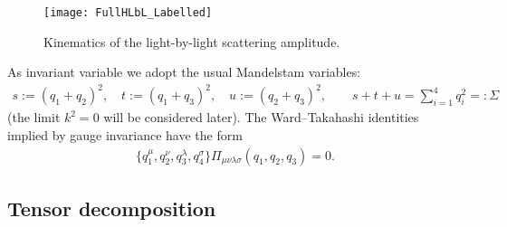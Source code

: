 \documentclass[epj]{webofc}
\newcommand{\<}{\langle}
\renewcommand{\>}{\rangle}
\begin{document}
\begin{figure}[t]
	\centering
	\texttt{[image: FullHLbL\_Labelled]}
	\caption{Kinematics of the light-by-light scattering amplitude.}
	\label{img:FullHLbL}
\end{figure}

As invariant variable we adopt the usual Mandelstam variables:
\begin{align}
	s := (q_1+q_2)^2, \quad t := (q_1+q_3)^2, \quad u := (q_2 + q_3)^2,
        \qquad s + t + u = \sum_{i=1}^4 q_i^2 =: \Sigma
\end{align}
(the limit $k^2 = 0$ will be considered later).
The Ward--Takahashi identities implied by gauge invariance have the form
\begin{align}
	\label{eq:WardIdentitiesHLbLTensor}
	\{q_1^\mu, q_2^\nu, q_3^\lambda, q_4^\sigma\} \Pi_{\mu\nu\lambda\sigma}(q_1,q_2,q_3) = 0 .
\end{align}


\subsection{Tensor decomposition}

\label{sec:HLbLTensorBTTDecomposition}
\end{document}
